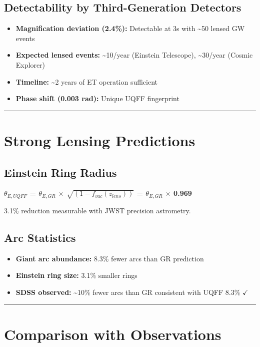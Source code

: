 \documentclass[12pt,a4paper]{article}
\begin{document}
\subsection{Detectability by Third-Generation Detectors}

\begin{itemize}
  \item \textbf{Magnification deviation (2.4\%):} Detectable at 3s with \textasciitilde{}50 lensed GW events  
  \item \textbf{Expected lensed events:} \textasciitilde{}10/year (Einstein Telescope), \textasciitilde{}30/year (Cosmic Explorer)  
  \item \textbf{Timeline:} \textasciitilde{}2 years of ET operation sufficient  
  \item \textbf{Phase shift (0.003 rad):} Unique UQFF fingerprint
\end{itemize}

\medskip\hrule\medskip

\section{Strong Lensing Predictions}

\subsection{Einstein Ring Radius}

\textbf{$\theta_{E,UQFF}$ = $\theta_{E,GR}$ $\times$ $\sqrt{(1 - f_{vac}(z_{lens}))}$ = $\theta_{E,GR}$ $\times$ 0.969}

3.1\% reduction  measurable with JWST precision astrometry.

\subsection{Arc Statistics}

\begin{itemize}
  \item \textbf{Giant arc abundance:} 8.3\% fewer arcs than GR prediction  
  \item \textbf{Einstein ring size:} 3.1\% smaller rings  
  \item \textbf{SDSS observed:} \textasciitilde{}10\% fewer arcs than GR  consistent with UQFF 8.3\% $\checkmark$
\end{itemize}

\medskip\hrule\medskip

\section{Comparison with Observations}
\end{document}
